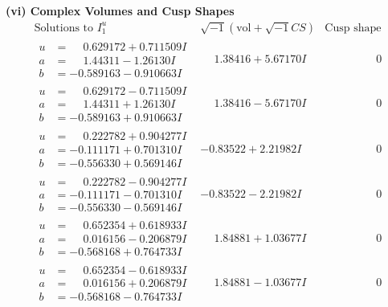 \documentclass[1p]{elsarticle_modified}
\theoremstyle{definition}
\newcommand{\I}{\sqrt{-1}}
\begin{document}
\newpage\flushleft \textbf{(vi) Complex Volumes and Cusp Shapes}
$$\begin{array}{c|c|c}  
\text{Solutions to }I^u_{1}& \I (\text{vol} + \sqrt{-1}CS) & \text{Cusp shape}\\
 \hline 
\begin{aligned}
u &= \phantom{-}0.629172 + 0.711509 I \\
a &= \phantom{-}1.44311 - 1.26130 I \\
b &= -0.589163 - 0.910663 I\end{aligned}
 & \phantom{-}1.38416 + 5.67170 I & \phantom{-0.000000 } 0 \\ \hline\begin{aligned}
u &= \phantom{-}0.629172 - 0.711509 I \\
a &= \phantom{-}1.44311 + 1.26130 I \\
b &= -0.589163 + 0.910663 I\end{aligned}
 & \phantom{-}1.38416 - 5.67170 I & \phantom{-0.000000 } 0 \\ \hline\begin{aligned}
u &= \phantom{-}0.222782 + 0.904277 I \\
a &= -0.111171 + 0.701310 I \\
b &= -0.556330 + 0.569146 I\end{aligned}
 & -0.83522 + 2.21982 I & \phantom{-0.000000 } 0 \\ \hline\begin{aligned}
u &= \phantom{-}0.222782 - 0.904277 I \\
a &= -0.111171 - 0.701310 I \\
b &= -0.556330 - 0.569146 I\end{aligned}
 & -0.83522 - 2.21982 I & \phantom{-0.000000 } 0 \\ \hline\begin{aligned}
u &= \phantom{-}0.652354 + 0.618933 I \\
a &= \phantom{-}0.016156 - 0.206879 I \\
b &= -0.568168 + 0.764733 I\end{aligned}
 & \phantom{-}1.84881 + 1.03677 I & \phantom{-0.000000 } 0 \\ \hline\begin{aligned}
u &= \phantom{-}0.652354 - 0.618933 I \\
a &= \phantom{-}0.016156 + 0.206879 I \\
b &= -0.568168 - 0.764733 I\end{aligned}
 & \phantom{-}1.84881 - 1.03677 I & \phantom{-0.000000 } 0 \\ \hline\begin{aligned}

\end{aligned}
\end{array}$$
\end{document}
